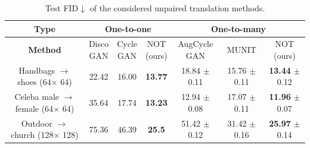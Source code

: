 \documentclass{article} %
\begin{document}
\begin{table}[!h]
\centering
\small
\begin{tabular}{|c|c|c|c|c|c|c|}
\toprule
\textbf{Type} & \multicolumn{3}{c|}{\textbf{One-to-one}} & \multicolumn{3}{c|}{\textbf{One-to-many}} \\ \midrule
\textbf{Method} & \makecell{Disco\\GAN} & \makecell{Cycle\\GAN} & \makecell{NOT\\(ours)} & \makecell{AugCycle\\GAN} & MUNIT & \makecell{NOT \\(ours)} \\ \midrule
\makecell{Handbags $\rightarrow$ shoes\\(64$\times$ 64)} & 22.42 & 16.00 & \textbf{13.77} & \makecell{18.84\\$\pm$ 0.11} & \makecell{15.76\\$\pm$ 0.11} & \makecell{\textbf{13.44}\\$\pm$ 0.12} \\ \midrule
\makecell{Celeba male $\rightarrow$ female\\(64$\times$ 64)} & 35.64  & 17.74  & \textbf{13.23} & \makecell{12.94\\$\pm$0.08}   & \makecell{17.07\\$\pm$0.11}   & \makecell{\textbf{11.96}\\$\pm$0.07} \\ \midrule
\makecell{Outdoor $\rightarrow$ church\\(128$\times$ 128)} & 75.36 & 46.39 & \textbf{25.5} & \makecell{51.42 \\$\pm$0.12} &  \makecell{31.42 \\$\pm$0.16}  & \makecell{\textbf{25.97}\\$\pm$0.14} \\ \bottomrule
\end{tabular}
\vspace{2mm}
\caption{\centering Test FID$\downarrow$ of the considered unpaired translation methods.}\label{table-fid}
\end{table}
\end{document}
